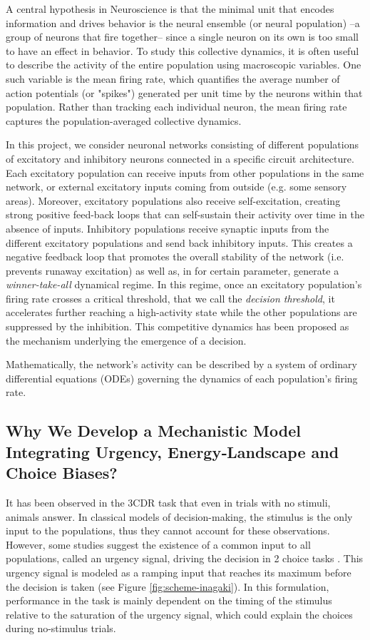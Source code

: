 \documentclass[12,twoside]{TFG-GM}
\theoremstyle{definition}
\theoremstyle{remark}
\begin{document}
A central hypothesis in Neuroscience is that the minimal unit that encodes information and drives behavior is the neural ensemble (or neural population) –a group of neurons that fire together– since a single neuron on its own is too small to have an effect in behavior. To study this collective dynamics, it is often useful to describe the activity of the entire population using macroscopic variables. One such variable is the mean firing rate, which quantifies the average number of action potentials (or "spikes") generated per unit time by the neurons within that population. Rather than tracking each individual neuron, the mean firing rate captures the population-averaged collective dynamics.

In this project, we consider neuronal networks consisting of different populations of excitatory and inhibitory neurons connected in a specific circuit architecture. Each excitatory population can receive inputs from other populations in the same network, or external excitatory inputs coming from outside (e.g. some sensory areas). Moreover, excitatory populations also receive self-excitation, creating strong positive feed-back loops that can self-sustain their activity over time in the absence of inputs.
Inhibitory populations receive synaptic inputs from the different excitatory populations and send back inhibitory inputs. This creates a negative feedback loop that promotes the overall stability of the network (i.e. prevents runaway excitation) as well as, in for certain parameter, generate  a \emph{winner-take-all} dynamical regime. In this regime, once an excitatory population’s firing rate crosses a critical threshold, that we call the \textit{decision threshold}, it accelerates further reaching a high-activity state while the other populations are suppressed by the inhibition. This competitive dynamics has been proposed as the mechanism underlying the emergence of a decision.

Mathematically, the network's activity can be described by a system of ordinary differential equations (ODEs) governing the dynamics of each population's firing rate.


\subsection{Why We Develop a Mechanistic Model Integrating Urgency, Energy‐Landscape and Choice Biases?} %
\label{sec:Mechanisticmodel}
It has been observed in the 3CDR task that even in trials with no stimuli, animals answer. In classical models of decision-making, the stimulus is the only input to the populations, thus they cannot account for these observations. However, some studies suggest the existence of a common input to all populations, called an urgency signal, driving the decision in 2 choice tasks \cite{inagaki2019}.  This urgency signal is modeled as a ramping input that reaches its maximum before the decision is taken (see Figure \ref{fig:scheme-inagaki}). In this formulation, performance in the task is mainly dependent on the timing of the stimulus relative to the saturation of the urgency signal, which could explain the choices during no-stimulus trials.
\end{document}
